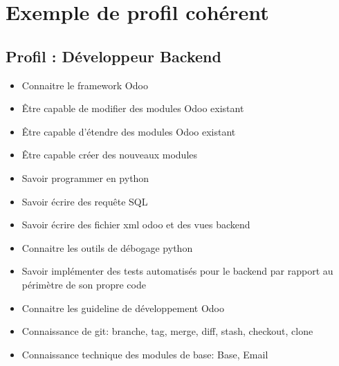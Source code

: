 \section{Exemple de profil cohérent}
\subsection{Profil : Développeur Backend}
\begin{itemize}
 \item Connaitre le framework Odoo
 \item Être capable de modifier des modules Odoo existant
 \item Être capable d'étendre des modules Odoo existant
 \item Être capable créer des nouveaux modules
 \item Savoir programmer en python
 \item Savoir écrire des requête SQL
 \item Savoir écrire des fichier xml odoo et des vues backend
 \item Connaitre les outils de débogage python
 \item Savoir implémenter des tests automatisés pour le backend par rapport au périmètre de son propre code
 \item Connaitre les guideline de développement Odoo
 \item Connaissance de git: branche, tag, merge, diff, stash, checkout, clone
 \item Connaissance technique des modules de base: Base, Email

\end{itemize}

